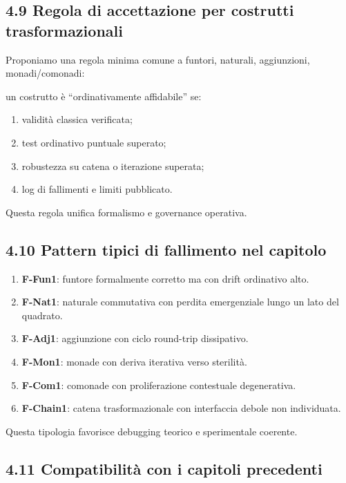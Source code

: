 \subsection{4.9 Regola di accettazione per costrutti trasformazionali}

Proponiamo una regola minima comune a funtori, naturali, aggiunzioni, monadi/comonadi:

un costrutto è ``ordinativamente affidabile'' se:

\begin{enumerate}
\def\labelenumi{\arabic{enumi}.}
\tightlist
\item
  validità classica verificata;
\item
  test ordinativo puntuale superato;
\item
  robustezza su catena o iterazione superata;
\item
  log di fallimenti e limiti pubblicato.
\end{enumerate}

Questa regola unifica formalismo e governance operativa.

\subsection{4.10 Pattern tipici di fallimento nel capitolo}

\begin{enumerate}
\def\labelenumi{\arabic{enumi}.}
\tightlist
\item
  \textbf{F-Fun1}: funtore formalmente corretto ma con drift ordinativo alto.
\item
  \textbf{F-Nat1}: naturale commutativa con perdita emergenziale lungo un lato del quadrato.
\item
  \textbf{F-Adj1}: aggiunzione con ciclo round-trip dissipativo.
\item
  \textbf{F-Mon1}: monade con deriva iterativa verso sterilità.
\item
  \textbf{F-Com1}: comonade con proliferazione contestuale degenerativa.
\item
  \textbf{F-Chain1}: catena trasformazionale con interfaccia debole non individuata.
\end{enumerate}

Questa tipologia favorisce debugging teorico e sperimentale coerente.

\subsection{4.11 Compatibilità con i capitoli precedenti}


